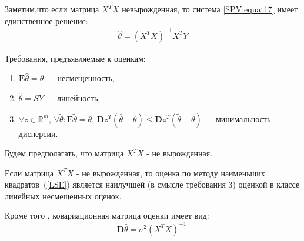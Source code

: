 \documentclass[10pt,slidestop,usepdftitle=false]{beamer}
\begin{document}
\begin{frame}
Заметим,что если матрица $X^TX$ невырожденная, то система
\eqref{SPV:equat17} имеет единственное решение:
\begin{eqnarray}\label{LSE}
\widehat{\theta}=(X^TX)^{-1}X^TY
\end{eqnarray}

\bigskip
\pause

Требования, предъявляемые к оценкам:
\begin{enumerate}
\bigskip
\pause

\item $\mathbf{E} \widehat\theta = \theta$ --- несмещенность,
\pause
\bigskip

\item $\widehat\theta = S Y$ --- линейность,
\bigskip
\pause

\item $\forall z \in \mathbb{R}^m$, $\forall \tilde{\theta} : \mathbf{E}\tilde{\theta} = \theta$, $\mathbf{D}z^T(\widehat\theta-\theta) \leq \mathbf{D}z^T(\tilde\theta-\theta)$ --- минимальность дисперсии.
\end{enumerate}
\bigskip
\pause

Будем предполагать, что матрица $X^T X$ - не вырожденная.

\pause
\begin{mytheorem}
Если матрица $X^T X$ - не вырожденная, то оценка по методу наименьших квадратов~(\ref{LSE}) является наилучшей (в смысле требования 3) оценкой в классе линейных несмещенных оценок.

Кроме того  , ковариационная матрица оценки имеет вид:
$$
\mathbf{D}\widehat\theta = \sigma^2 \left( X^T X \right)^{-1}.
$$
\end{mytheorem}
\end{frame}
\end{document}
